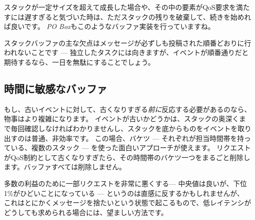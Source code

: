 スタックが一定サイズを超えて成長した場合や、その中の要素がQoS要求を満たすには遅すぎると気づいた時は、ただスタックの残りを破棄して、続きを始めれば良いです。
\emph{PO Box}もこのようなバッファ実装を行っていますね。

スタックバッファの主な欠点はメッセージが必ずしも投稿された順番どおりに行われないことです --- 独立したタスクには向きますが、イベントが順番通りだと期待するなら、一日を無駄にすることでしょう。

\subsection{時間に敏感なバッファ}

もし、古いイベントに対して、古くなりすぎる\emph{前に}反応する必要があるのなら、物事はより複雑になります。
イベントが古いかどうかは、スタックの奥深くまで毎回確認しなければわかりませんし、スタックを底からものをイベントを取り出すのは普通、非効率です。
この場合、バケツ --- それぞれが担当時間帯を持っている、複数のスタック --- を使った面白いアプローチが使えます。
リクエストがQoS制約として古くなりすぎたら、その時間帯のバケツ一つをまるごと削除します。バッファすべては削除しません。

多数の利益のために一部リクエストを非常に悪くする--- 中央値は良いが、下位1\%がひどいことになっている --- というのは直感に反するかもしれませんが、
これはとにかくメッセージを捨たいという状態で起こるもので、低レイテンシがどうしても求められる場合には、望ましい方法です。

